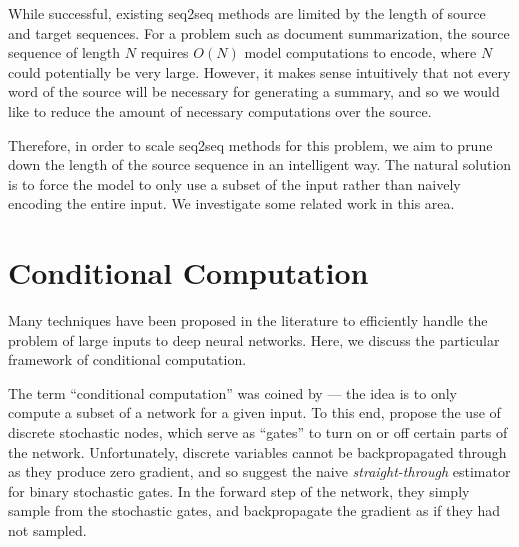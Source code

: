 \documentclass[12pt]{report}
\begin{document}
While successful, existing seq2seq methods are limited by the length of source and target sequences. For a problem such as document summarization, the source sequence of length $N$ requires $O(N)$ model computations to encode, where $N$ could potentially be very large. However, it makes sense intuitively that not every word of the source will be necessary for generating a summary, and so we would like to reduce the amount of necessary computations over the source.

Therefore, in order to scale seq2seq methods for this problem, we aim to prune down the length of the source sequence in an intelligent way. The natural solution is to force the model to only use a subset of the input rather than naively encoding the entire input. We investigate some related work in this area.


\section{Conditional Computation}




Many techniques have been proposed in the literature to efficiently handle the problem of large inputs to deep neural networks. Here, we discuss the particular framework of conditional computation.

The term ``conditional computation'' was coined by \citet{BengioLC13} --- the idea is to only compute a subset of a network for a given input. 
To this end, \citet{BengioLC13} propose the use of discrete stochastic nodes, which serve as ``gates'' to turn on or off certain parts of the network.
Unfortunately, discrete variables cannot be backpropagated through as they produce zero gradient, and so \citet{BengioLC13} suggest the naive \emph{straight-through} estimator for binary stochastic gates.
In the forward step of the network, they simply sample from the stochastic gates, and backpropagate the gradient as if they had not sampled.
\end{document}
